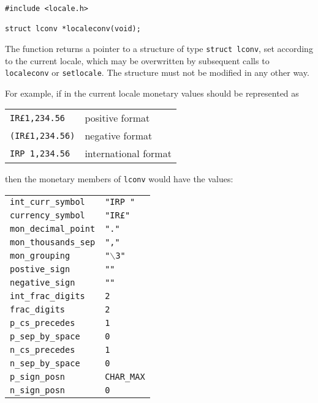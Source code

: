   \begin{Verbatim}
#include <locale.h>

struct lconv *localeconv(void);
\end{Verbatim}

   The function returns a pointer to a structure of type \texttt{struct
   lconv},  set  according  to  the current locale, which may be
   overwritten by subsequent calls to \texttt{localeconv} or
   \texttt{setlocale}.  The structure must not be modified in any other
   way.


   For example, if in the current locale monetary values should
   be represented as


   \begin{tabular}{ll}
     \hline
     \texttt{IR\pounds1,234.56}   & positive format    \\
     \texttt{(IR\pounds1,234.56)} & negative format    \\
     \texttt{IRP 1,234.56}        & international format    \\
     \hline
   \end{tabular}


   then the monetary members of \texttt{lconv} would have the
    values:


   \begin{tabular}{ll}
     \hline
     \texttt{int\_curr\_symbol}   & \texttt{"IRP "}    \\
     \texttt{currency\_symbol}    & \texttt{"IR\pounds"}    \\
     \texttt{mon\_decimal\_point} & \texttt{"."}    \\
     \texttt{mon\_thousands\_sep} & \texttt{","}    \\
     \texttt{mon\_grouping}       & \texttt{"$\backslash$3"}    \\
     \texttt{postive\_sign}       & \texttt{""}    \\
     \texttt{negative\_sign}      & \texttt{""}    \\
     \texttt{int\_frac\_digits}   & \texttt{2}    \\
     \texttt{frac\_digits}        & \texttt{2}    \\
     \texttt{p\_cs\_precedes}     & \texttt{1}    \\
     \texttt{p\_sep\_by\_space}   & \texttt{0}    \\
     \texttt{n\_cs\_precedes}     & \texttt{1}    \\
     \texttt{n\_sep\_by\_space}   & \texttt{0}    \\
     \texttt{p\_sign\_posn}       & \texttt{CHAR\_MAX}    \\
     \texttt{n\_sign\_posn}       & \texttt{0}    \\
     \hline
   \end{tabular}


